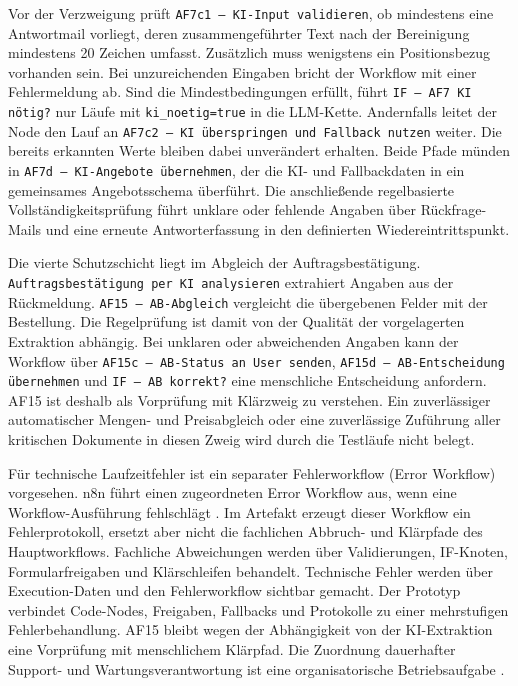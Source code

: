 \documentclass[a4paper,12pt]{article}
\begin{document}
Vor der Verzweigung prüft \texttt{AF7c1 -- KI-Input validieren}, ob mindestens eine Antwortmail vorliegt, deren zusammengeführter Text nach der Bereinigung mindestens 20 Zeichen umfasst. Zusätzlich muss wenigstens ein Positionsbezug vorhanden sein. Bei unzureichenden Eingaben bricht der Workflow mit einer Fehlermeldung ab. Sind die Mindestbedingungen erfüllt, führt \texttt{IF -- AF7 KI nötig?} nur Läufe mit \texttt{ki\_noetig=true} in die LLM-Kette. Andernfalls leitet der Node den Lauf an \texttt{AF7c2 -- KI überspringen und Fallback nutzen} weiter. Die bereits erkannten Werte bleiben dabei unverändert erhalten. Beide Pfade münden in \texttt{AF7d -- KI-Angebote übernehmen}, der die KI- und Fallbackdaten in ein gemeinsames Angebotsschema überführt. Die anschließende regelbasierte Vollständigkeitsprüfung führt unklare oder fehlende Angaben über Rückfrage-Mails und eine erneute Antworterfassung in den definierten Wiedereintrittspunkt.

Die vierte Schutzschicht liegt im Abgleich der Auftragsbestätigung. \texttt{Auftragsbestätigung per KI analysieren} extrahiert Angaben aus der Rückmeldung. \texttt{AF15 -- AB-Abgleich} vergleicht die übergebenen Felder mit der Bestellung. Die Regelprüfung ist damit von der Qualität der vorgelagerten Extraktion abhängig. Bei unklaren oder abweichenden Angaben kann der Workflow über \texttt{AF15c -- AB-Status an User senden}, \texttt{AF15d -- AB-Entscheidung übernehmen} und \texttt{IF -- AB korrekt?} eine menschliche Entscheidung anfordern. AF15 ist deshalb als Vorprüfung mit Klärzweig zu verstehen. Ein zuverlässiger automatischer Mengen- und Preisabgleich oder eine zuverlässige Zuführung aller kritischen Dokumente in diesen Zweig wird durch die Testläufe nicht belegt.

Für technische Laufzeitfehler ist ein separater Fehlerworkflow (Error Workflow) vorgesehen. n8n führt einen zugeordneten Error Workflow aus, wenn eine Workflow-Ausführung fehlschlägt \parencite{n8n_docs_2026}. Im Artefakt erzeugt dieser Workflow ein Fehlerprotokoll, ersetzt aber nicht die fachlichen Abbruch- und Klärpfade des Hauptworkflows. Fachliche Abweichungen werden über Validierungen, IF-Knoten, Formularfreigaben und Klärschleifen behandelt. Technische Fehler werden über Execution-Daten und den Fehlerworkflow sichtbar gemacht. Der Prototyp verbindet Code-Nodes, Freigaben, Fallbacks und Protokolle zu einer mehrstufigen Fehlerbehandlung. AF15 bleibt wegen der Abhängigkeit von der KI-Extraktion eine Vorprüfung mit menschlichem Klärpfad. Die Zuordnung dauerhafter Support- und Wartungsverantwortung ist eine organisatorische Betriebsaufgabe \parencite{herm_framework_2023}.
\end{document}
